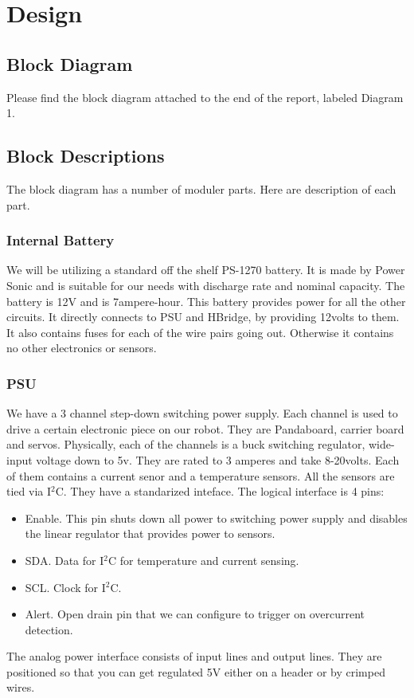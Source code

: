 \documentclass[12pt]{article}
\begin{document}
 \section{Design}
 \subsection{Block Diagram}
 Please find the block diagram attached to the end of the report, labeled Diagram 1.
 \subsection{Block Descriptions} The block diagram has a number of moduler parts. Here are description of each part.

 \subsubsection{Internal Battery} We will be utilizing a standard off the shelf PS-1270 battery. It is made by Power Sonic and is suitable for our needs with discharge rate and nominal capacity. The battery is 12V and is 7ampere-hour. This battery provides power for all the other circuits. It directly connects to PSU and HBridge, by providing 12volts to them. It also contains fuses for each of the wire pairs going out. Otherwise it contains no other electronics or sensors.
 \subsubsection{PSU} We have a 3 channel step-down switching power supply. Each channel is used to drive a certain electronic piece on our robot. They are Pandaboard, carrier board and servos. Physically, each of the channels is a buck switching regulator, wide-input voltage down to 5v. They are rated to 3 amperes and take 8-20volts.  Each of them contains a current senor and a temperature sensors. All the sensors are tied via I$^{\textrm{2}}$C. They have a standarized inteface. The logical interface is 4 pins:
 \begin{itemize} 
   \item Enable. This pin shuts down all power to switching power supply and disables the linear regulator that provides power to sensors. 
   \item SDA. Data for I$^{\textrm{2}}$C for temperature and current sensing.
   \item SCL. Clock for I$^{\textrm{2}}$C.
   \item Alert. Open drain pin that we can configure to trigger on overcurrent detection.
 \end{itemize} The analog power interface consists of input lines and output lines. They are positioned so that you can get regulated 5V either on a header or by crimped wires.
\end{document}
